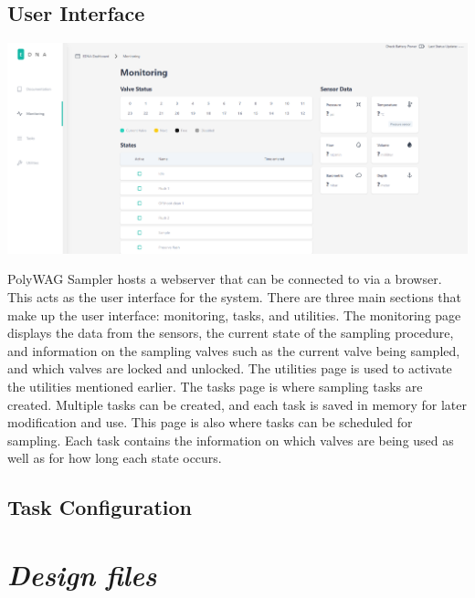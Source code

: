 \documentclass[11pt, letterpaper]{article}
\begin{document}
\subsection{User Interface}

\begin{center}
	\includegraphics[scale=0.35]{./Assets/UI.png}
\end{center}

PolyWAG Sampler hosts a webserver that can be connected to via a browser. This acts as the user interface for the system. There are three main sections that make up the user interface: monitoring, tasks, and utilities. The monitoring page displays the data from the sensors, the current state of the sampling procedure, and information on the sampling valves such as the current valve being sampled, and which valves are locked and unlocked. The utilities page is used to activate the utilities mentioned earlier. The tasks page is where sampling tasks are created. Multiple tasks can be created, and each task is saved in memory for later modification and use. This page is also where tasks can be scheduled for sampling. Each task contains the information on which valves are being used as well as for how long each state occurs. 


\subsection{Task Configuration}



\section*{\textit{Design files}}
\end{document}
